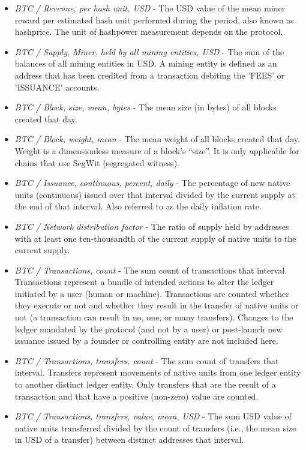 \begin{itemize}
    \item \textit{BTC / Revenue, per hash unit, USD} - The USD value of the mean miner reward per estimated hash unit performed during the period, also known as hashprice. The unit of hashpower measurement depends on the protocol.
    \item \textit{BTC / Supply, Miner, held by all mining entities, USD} - The sum of the balances of all mining entities in USD. A mining entity is defined as an address that has been credited from a transaction debiting the 'FEES' or 'ISSUANCE' accounts.
    \item \textit{BTC / Block, size, mean, bytes} - The mean size (in bytes) of all blocks created that day.
    \item \textit{BTC / Block, weight, mean} - The mean weight of all blocks created that day. Weight is a dimensionless measure of a block’s “size”. It is only applicable for chains that use SegWit (segregated witness).
    \item \textit{BTC / Issuance, continuous, percent, daily} - The percentage of new native units (continuous) issued over that interval divided by the current supply at the end of that interval. Also referred to as the daily inflation rate.
    \item \textit{BTC / Network distribution factor} - The ratio of supply held by addresses with at least one ten-thousandth of the current supply of native units to the current supply.
    \item \textit{BTC / Transactions, count} - The sum count of transactions that interval. Transactions represent a bundle of intended actions to alter the ledger initiated by a user (human or machine). Transactions are counted whether they execute or not and whether they result in the transfer of native units or not (a transaction can result in no, one, or many transfers). Changes to the ledger mandated by the protocol (and not by a user) or post-launch new issuance issued by a founder or controlling entity are not included here.
    \item \textit{BTC / Transactions, transfers, count} - The sum count of transfers that interval. Transfers represent movements of native units from one ledger entity to another distinct ledger entity. Only transfers that are the result of a transaction and that have a positive (non-zero) value are counted.
    \item \textit{BTC / Transactions, transfers, value, mean, USD} - The sum USD value of native units transferred divided by the count of transfers (i.e., the mean size in USD of a transfer) between distinct addresses that interval.
\end{itemize}


